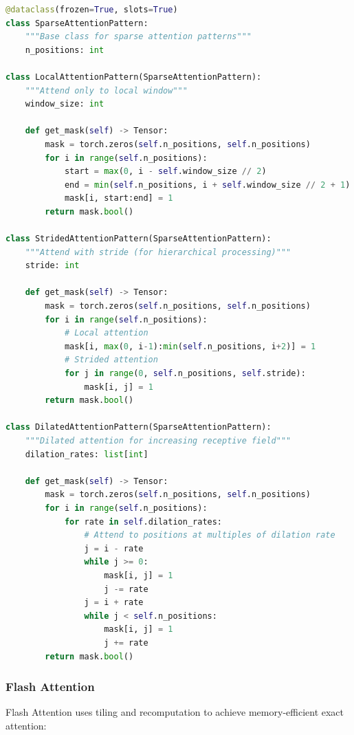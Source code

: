 \documentclass[11pt]{article}
\begin{document}
\begin{lstlisting}[language=Python, caption=Sparse Attention Patterns]
@dataclass(frozen=True, slots=True)
class SparseAttentionPattern:
    """Base class for sparse attention patterns"""
    n_positions: int
    
class LocalAttentionPattern(SparseAttentionPattern):
    """Attend only to local window"""
    window_size: int
    
    def get_mask(self) -> Tensor:
        mask = torch.zeros(self.n_positions, self.n_positions)
        for i in range(self.n_positions):
            start = max(0, i - self.window_size // 2)
            end = min(self.n_positions, i + self.window_size // 2 + 1)
            mask[i, start:end] = 1
        return mask.bool()

class StridedAttentionPattern(SparseAttentionPattern):
    """Attend with stride (for hierarchical processing)"""
    stride: int
    
    def get_mask(self) -> Tensor:
        mask = torch.zeros(self.n_positions, self.n_positions)
        for i in range(self.n_positions):
            # Local attention
            mask[i, max(0, i-1):min(self.n_positions, i+2)] = 1
            # Strided attention
            for j in range(0, self.n_positions, self.stride):
                mask[i, j] = 1
        return mask.bool()

class DilatedAttentionPattern(SparseAttentionPattern):
    """Dilated attention for increasing receptive field"""
    dilation_rates: list[int]
    
    def get_mask(self) -> Tensor:
        mask = torch.zeros(self.n_positions, self.n_positions)
        for i in range(self.n_positions):
            for rate in self.dilation_rates:
                # Attend to positions at multiples of dilation rate
                j = i - rate
                while j >= 0:
                    mask[i, j] = 1
                    j -= rate
                j = i + rate
                while j < self.n_positions:
                    mask[i, j] = 1
                    j += rate
        return mask.bool()
\end{lstlisting}

\subsubsection{Flash Attention}

Flash Attention uses tiling and recomputation to achieve memory-efficient exact attention:
\end{document}
